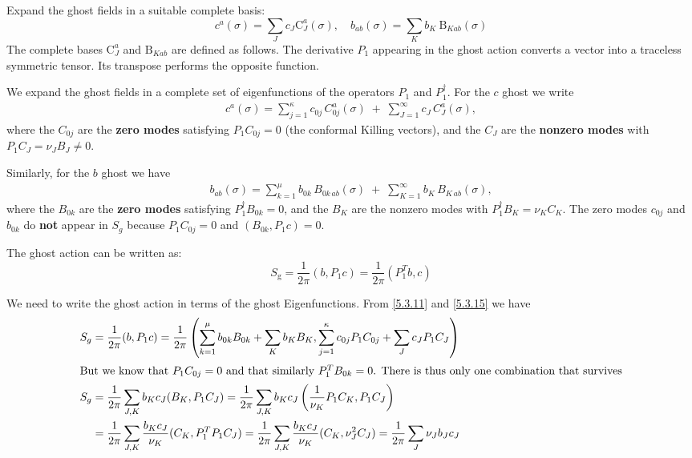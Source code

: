 Expand the ghost fields in a suitable complete basis:
\begin{equation}
	c^{a}(\sigma)=\sum_{J} c_{J} \mathrm{C}_{J}^{a}(\sigma), \quad b_{a b}(\sigma)=\sum_{K} b_{K} \mathrm{~B}_{K a b}(\sigma)
\end{equation}
The complete bases $\mathrm{C}_{J}^{a}$ and $\mathrm{B}_{K a b}$ are defined as follows. The derivative $P_{1}$ appearing in the ghost action converts a vector into a traceless symmetric tensor. Its transpose performs the opposite function. 
\begin{tcolorbox}[breakable]
	\begin{remark}
		We expand the ghost fields in a complete set of eigenfunctions of the operators $P_1$ and $P_1^\dagger$. For the $c$ ghost we write
		\begin{align}
			c^{a}(\sigma) = \sum_{j=1}^{\kappa} c_{0j} \, C_{0j}^{a}(\sigma) \;+\; \sum_{J=1}^{\infty} c_{J} \, C_{J}^{a}(\sigma),
		\end{align}
		where the $C_{0j}$ are the \textbf{zero modes} satisfying $P_1 C_{0j} = 0$ (the conformal Killing vectors), and the $C_{J}$ are the \textbf{nonzero modes} with $P_1 C_{J} = \nu_J B_J \neq 0$.
		
		Similarly, for the $b$ ghost we have
		\begin{align}
			b_{ab}(\sigma) = \sum_{k=1}^{\mu} b_{0k} \, B_{0k\,ab}(\sigma) \;+\; \sum_{K=1}^{\infty} b_{K} \, B_{K\,ab}(\sigma),
		\end{align}
		where the $B_{0k}$ are the \textbf{zero modes} satisfying $P_1^\dagger B_{0k} = 0$, and the $B_{K}$ are the nonzero modes with $P_1^\dagger B_K = \nu_K C_K$. The zero modes $c_{0j}$ and $b_{0k}$ do \textbf{not} appear in $S_g$ because $P_1 C_{0j}=0$ and $(B_{0k}, P_1 c)=0$.
	\end{remark}
\end{tcolorbox}
The ghost action can be written as:
\begin{equation}
	S_{\mathrm{g}}=\frac{1}{2 \pi}\left(b, P_{1} c\right)=\frac{1}{2 \pi}\left(P_{1}^{T} b, c\right)\label{5.3.11}
\end{equation}
\begin{tcolorbox}[breakable]
	\begin{remark}
		We need to write the ghost action in terms of the ghost Eigenfunctions. From \eqref{5.3.11} and
		\eqref{5.3.15} we have
		\begin{align}
			S_g &= \frac{1}{2\pi} (b, P_1 c) = \frac{1}{2\pi} \left( \sum_{k=1}^\mu b_{0k} B_{0k} + \sum_K b_K B_K, \sum_{j=1}^\kappa c_{0j} P_1 C_{0j} + \sum_J c_J P_1 C_J \right) \nonumber \\
			\intertext{But we know that $P_1 C_{0j} = 0$ and that similarly $P_1^T B_{0k} = 0$. There is thus only one combination that survives}
			S_g &= \frac{1}{2\pi} \sum_{J,K} b_K c_J (B_K, P_1 C_J) = \frac{1}{2\pi} \sum_{J,K} b_K c_J \left( \frac{1}{\nu_K} P_1 C_K, P_1 C_J \right) \nonumber \\
			&= \frac{1}{2\pi} \sum_{J,K} \frac{b_K c_J}{\nu_K} (C_K, P_1^T P_1 C_J) = \frac{1}{2\pi} \sum_{J,K} \frac{b_K c_J}{\nu_K} (C_K, \nu_J^2 C_J) = \frac{1}{2\pi} \sum_J \nu_J b_J c_J
		\end{align}
	\end{remark}
\end{tcolorbox}
